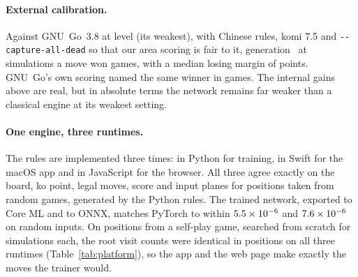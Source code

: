 \paragraph{External calibration.}
\label{sec:gnugo}
Against GNU~Go~3.8 at level \valGnuLevel{} (its weakest), with Chinese rules, komi 7.5 and
\texttt{-{}-capture-all-dead} so that our area scoring is fair to it, generation~\valNGens{} at \valGnuSims{}
simulations a move won \valGnuWins{} games, with a median losing margin of \valGnuMedianMargin{} points.
GNU~Go's own scoring named the same winner in \valGnuScoreAgree{} games. The internal gains above are real,
but in absolute terms the network remains far weaker than a classical engine at its weakest setting.

\paragraph{One engine, three runtimes.}
The rules are implemented three times: in Python for training, in Swift for the macOS app and in JavaScript
for the browser. All three agree exactly on the board, ko point, legal moves, score and input planes for
\valRuleCases{} positions taken from \valRuleGames{} random games, generated by the Python rules. The trained
network, exported to Core ML and to ONNX, matches PyTorch to within $5.5\times10^{-6}$ and
$7.6\times10^{-6}$ on random inputs. On \valBenchPositions{} positions from a self-play game,
searched from scratch for \valBenchSims{} simulations each, the root visit counts were identical in
\valBenchIdentical{} positions on all three runtimes (Table~\ref{tab:platform}), so the app and the web page
make exactly the moves the trainer would.

\begin{table}[t]
\centering
\small

\caption{The same search on three runtimes: PyTorch (Python trainer), Core ML (Swift app) and ONNX Runtime
Web (browser, WebAssembly). Columns: median time (ms) for a \valBenchSims{}-simulation search over
\valBenchPositions{} positions (best of three runs each, one leaf per network call, one CPU thread); positions
whose root visit counts equal PyTorch's exactly; largest network output difference from PyTorch.}
\label{tab:platform}
\end{table}
